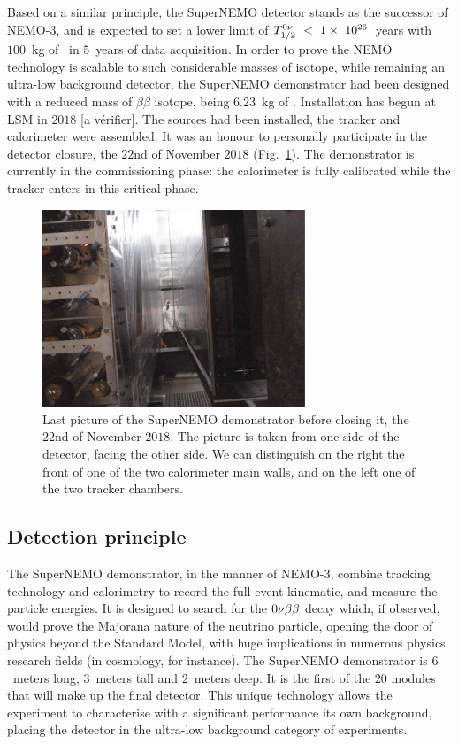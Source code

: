 Based on a similar principle, the SuperNEMO detector stands as the successor of NEMO-$3$, and is expected to set a lower limit of $T_{1/2}^{0\nu}~<~1\times~10^{26}$~years with $100$~kg of \Se\ in $5$~years of data acquisition.
In order to prove the NEMO technology is scalable to such considerable masses of isotope, while remaining an ultra-low background detector, the SuperNEMO demonstrator had been designed with a reduced mass of $\beta\beta$ isotope, being $6.23$~kg of \Se.
Installation has begun at LSM in $2018$ [a vérifier].
The sources had been installed, the tracker and calorimeter were assembled.
It was an honour to personally participate in the detector closure, the $22$nd of November $2018$ (Fig.~\ref{fig:detector_closing}).
The demonstrator is currently in the commissioning phase: the calorimeter is fully calibrated while the tracker enters in this critical phase.
\begin{figure}[h!]
\centering
\includegraphics[width=0.7\textwidth]{SNdemonstrator/fig_SNdemonstrator/detector_closing.pdf}
\caption{Last picture of the SuperNEMO demonstrator before closing it, the $22$nd of November $2018$.
  The picture is taken from one side of the detector, facing the other side.
  We can distinguish on the right the front of one of the two calorimeter main walls, and on the left one of the two tracker chambers.
\label{fig:detector_closing}}
\end{figure}


\subsection{Detection principle}

The SuperNEMO demonstrator, in the manner of NEMO-$3$, combine tracking technology and calorimetry to record the full event kinematic, and measure the particle energies.
It is designed to search for the $0\nu\beta\beta$ decay which, if observed, would prove the Majorana nature of the neutrino particle, opening the door of physics beyond the Standard Model, with huge implications in numerous physics research fields (in cosmology, for instance).
The SuperNEMO demonstrator is $6$~meters long, $3$~meters tall and $2$~meters deep.
It is the first of the $20$ modules that will make up the final detector.
This unique technology allows the experiment to characterise with a significant performance its own background, placing the detector in the ultra-low background category of experiments.

